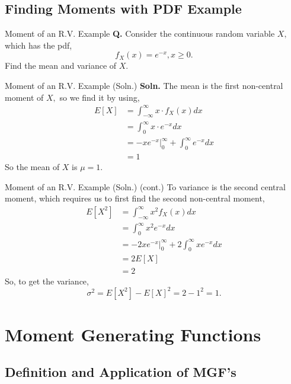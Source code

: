 \documentclass{beamer}
\begin{document}
\subsection{Finding Moments with PDF Example}

\begin{frame}{Moment of an R.V. Example}
    \textbf{Q.} Consider the continuous random variable $X,$ which has the pdf,
    $$
    f_X(x) = e^{-x}, x\ge 0.
    $$
    Find the mean and variance of $X.$
\end{frame}

\begin{frame}{Moment of an R.V. Example (Soln.)}
    \textbf{Soln.} The mean is the first non-central moment of $X,$ so we find it by using,
    \begin{align*}
        E[X] &= \int_{-\infty}^{\infty} x \cdot f_X(x) dx \\
        &= \int_{0}^{\infty} x \cdot e^{-x} dx \\
        &= \left. -x e^{-x}\right|_{0}^{\infty}  +\int_{0}^{\infty} e^{-x} dx \\
        &= 1
    \end{align*}
    So the mean of $X$ is $\mu = 1.$
\end{frame}

\begin{frame}{Moment of an R.V. Example (Soln.) (cont.)}
    To variance is the second central moment, which requires us to first find the second non-central moment,
    \begin{align*}
        E\left[X^2\right] &= \int_{-\infty}^{\infty} x^2 f_X(x) dx \\
        &= \int_{0}^{\infty} x^2 e^{-x} dx \\
        &= \left. -2xe^{-x} \right|_{0}^{\infty} + 2 \int_{0}^{\infty} x e^{-x} dx \\
        &= 2 E[X] \\
        &= 2
    \end{align*}
    So, to get the variance,
    $$
    \sigma^2 = E[X^2] - E[X]^2 = 2 - 1^2 = 1.
    $$
\end{frame}

\section{Moment Generating Functions}

\subsection{Definition and Application of MGF's}
\end{document}
